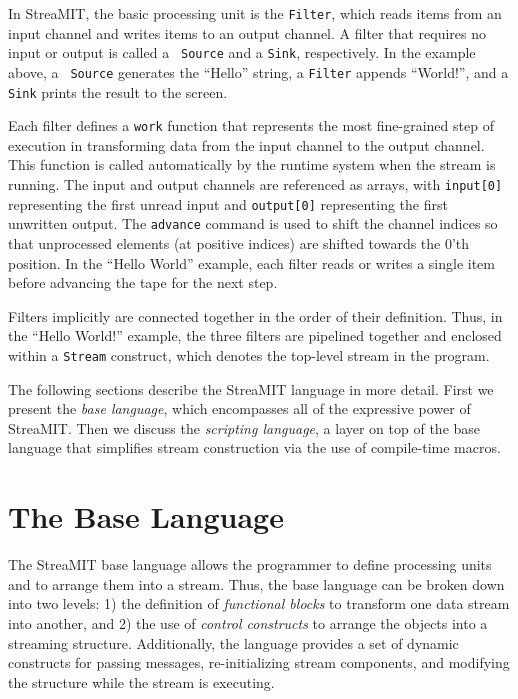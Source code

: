 \documentclass[draft]{article}
\begin{document}
In StreaMIT, the basic processing unit is the {\tt Filter}, which
reads items from an input channel and writes items to an output
channel.  A filter that requires no input or output is called a {\tt
Source} and a {\tt Sink}, respectively.  In the example above, a {\tt
Source} generates the ``Hello'' string, a {\tt Filter} appends
``World!'', and a {\tt Sink} prints the result to the screen.

Each filter defines a {\tt work} function that represents the most
fine-grained step of execution in transforming data from the input
channel to the output channel.  This function is called automatically
by the runtime system when the stream is running.  The input and
output channels are referenced as arrays, with {\tt input[0]}
representing the first unread input and {\tt output[0]} representing
the first unwritten output.  The {\tt advance} command is used to
shift the channel indices so that unprocessed elements (at positive
indices) are shifted towards the 0'th position.  In the ``Hello
World'' example, each filter reads or writes a single item before
advancing the tape for the next step.

Filters implicitly are connected together in the order of their
definition.  Thus, in the ``Hello World!'' example, the three filters
are pipelined together and enclosed within a {\tt Stream} construct,
which denotes the top-level stream in the program.

The following sections describe the StreaMIT language in more detail.
First we present the {\it base language}, which encompasses all of the
expressive power of StreaMIT.  Then we discuss the {\it scripting
language}, a layer on top of the base language that simplifies stream
construction via the use of compile-time macros.

\section{The Base Language}

The StreaMIT base language allows the programmer to define processing
units and to arrange them into a stream.  Thus, the base language can
be broken down into two levels: 1) the definition of {\it functional
blocks} to transform one data stream into another, and 2) the use of
{\it control constructs} to arrange the objects into a streaming
structure.  Additionally, the language provides a set of dynamic
constructs for passing messages, re-initializing stream components,
and modifying the structure while the stream is executing.
\end{document}
